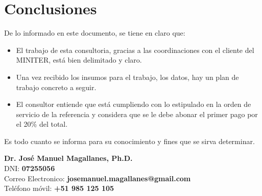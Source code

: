 \documentclass[a4paper,12pt]{texMemo} %
\begin{document}
\section{Conclusiones}

De lo informado en este documento, se tiene en claro que:

\begin{itemize}
\item El trabajo de esta consultoria, gracias a las coordinaciones con el cliente del MINITER, está bien delimitado y claro.
\item Una vez recibido los insumos para el trabajo, los datos, hay un plan de trabajo concreto a seguir.
\item El consultor entiende que está cumpliendo con lo estipulado en la orden de servicio de la referencia y considera que se le debe abonar el primer pago por el 20\% del total.

\end{itemize}


Es todo cuanto se informa para su conocimiento y fines que se sirva determinar.




\vspace{75px}
\noindent
{\bf Dr. José Manuel Magallanes, Ph.D.}\\
DNI: {\bf 07255056}\\
Correo Electronico: {\bf josemanuel.magallanes@gmail.com}\\
Tel\'{e}fono m\'{o}vil: {\bf +51 985 125 105}


\end{document}
